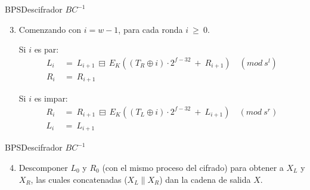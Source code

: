 \begin{frame}{BPS}{Descifrador $BC^{-1}$}

  \begin{enumerate}
    \setcounter{enumi}{2}
    \item Comenzando con $i=w-1$, para cada ronda $i\: \geq\: 0$.

    Si $i$ es par:
    \begin{align}
      L_i\: &=\: L_{i+1}\: \boxminus\: 
                E_K((T_R \oplus i) \cdot 2^{f-32}\: +\: R_{i+1})\quad 
                (mod\ s^l) \\
      R_i\: &=\: R_{i+1}
    \end{align}

    Si $i$ es impar:
    \begin{align}
      R_i\: &=\: R_{i+1}\: \boxminus\: 
                E_K((T_L \oplus i) \cdot 2^{f-32}\: +\: L_{i+1})\quad 
                (mod\ s^r) \\
      L_i\: &=\: L_{i+1}
    \end{align}

  \end{enumerate}
\end{frame}

\begin{frame}{BPS}{Descifrador $BC^{-1}$}

  \begin{enumerate}
    \setcounter{enumi}{3}
    \item Descomponer $L_0$ y $R_0$ (con el mismo proceso del cifrado) para 
      obtener a $X_L$ y $X_R$, las cuales concatenadas ($X_L \parallel X_R$) 
      dan la cadena de salida $X$.
  \end{enumerate}
  
\end{frame}

